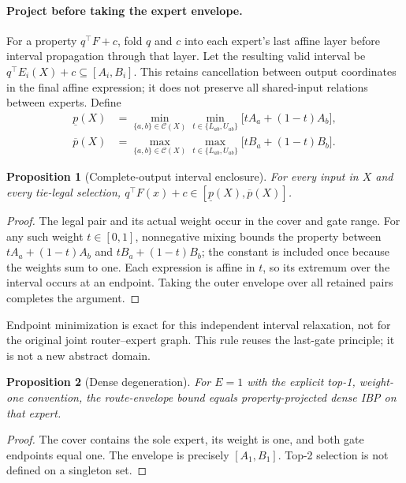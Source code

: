 \documentclass[10pt]{article}
\newtheorem{proposition}{Proposition}
\begin{document}
\paragraph{Project before taking the expert envelope.}
For a property $q^\top F+c$, fold $q$ and $c$ into each expert's last affine
layer before interval propagation through that layer. Let the resulting valid
interval be $q^\top E_i(X)+c\subseteq[A_i,B_i]$. This retains cancellation
between output coordinates in the final affine expression; it does not
preserve all shared-input relations between experts. Define
\begin{align*}
 \underline p(X)&=\min_{\{a,b\}\in\mathcal C(X)}
       \min_{t\in\{L_{ab},U_{ab}\}}
       \bigl[tA_a+(1-t)A_b\bigr],\\
 \overline p(X)&=\max_{\{a,b\}\in\mathcal C(X)}
       \max_{t\in\{L_{ab},U_{ab}\}}
       \bigl[tB_a+(1-t)B_b\bigr].
\end{align*}
\begin{proposition}[Complete-output interval enclosure]
For every input in $X$ and every tie-legal selection,
$q^\top F(x)+c\in[\underline p(X),\overline p(X)]$.
\end{proposition}
\begin{proof}
The legal pair and its actual weight occur in the cover and gate range.
For any such weight $t\in[0,1]$, nonnegative mixing bounds the property
between $tA_a+(1-t)A_b$ and $tB_a+(1-t)B_b$; the constant is included once
because the weights sum to one. Each expression is affine in $t$, so its
extremum over the interval occurs at an endpoint. Taking the outer envelope
over all retained pairs completes the argument.
\end{proof}
Endpoint minimization is exact for this independent interval relaxation,
not for the original joint router--expert graph. This rule reuses the
last-gate principle; it is not a new abstract domain. \begin{proposition}[Dense degeneration]
For $E=1$ with the explicit top-1, weight-one convention, the route-envelope
bound equals property-projected dense IBP on that expert.
\end{proposition}
\begin{proof}
The cover contains the sole expert, its weight is one, and both gate
endpoints equal one. The envelope is precisely $[A_1,B_1]$.
Top-2 selection is not defined on a singleton set.
\end{proof}
\end{document}
